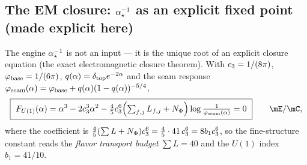 \subsection{The EM closure: $\alpha^{-1}_\star$ as an explicit fixed point (made explicit here)}
The engine $\alpha^{-1}_\star$ is not an input --- it is the unique root of an explicit closure equation
(the exact electromagnetic closure theorem). With $c_3=1/(8\pi)$, $\varphi_{\mathrm{base}}=1/(6\pi)$,
$q(\alpha)=\delta_{\mathrm{top}} e^{-2\alpha}$ and the seam response $\varphi_{\mathrm{seam}}(\alpha)=\varphi_{\mathrm{base}}+q(\alpha)(1-q(\alpha))^{-5/4}$,
\begin{equation}
  \boxed{\ F_{U(1)}(\alpha)=\alpha^3-2\cthree^3\alpha^2-\tfrac{4}{5}\cthree^6\Bigl(\textstyle\sum_{f,j}L_{f,j}+N_\Phi\Bigr)\log\frac{1}{\phiseam(\alpha)}=0\ }\qquad\mE/\mC ,
\end{equation}
where the coefficient is $\tfrac45(\sum L+N_\Phi)c_3^6=\tfrac45\cdot41\,c_3^6=8b_1c_3^6$, so the
fine-structure constant reads the \emph{flavor transport budget} $\sum L=40$ and the $U(1)$ index
$b_1=41/10$.

